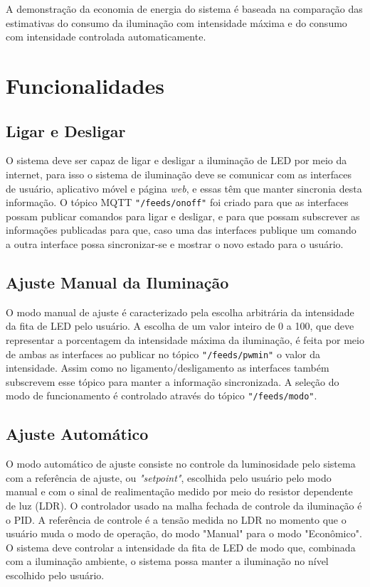 A demonstração da economia de energia do sistema é baseada na comparação das estimativas do consumo da iluminação com intensidade máxima e do consumo com intensidade controlada automaticamente.

\section{Funcionalidades}

\subsection{Ligar e Desligar}

O sistema deve ser capaz de ligar e desligar a iluminação de LED por meio da internet, para isso o sistema de iluminação deve se comunicar com as interfaces de usuário, aplicativo móvel e página \textit{web}, e essas têm que manter sincronia desta informação. O tópico MQTT \texttt{"/feeds/onoff"} foi criado para que as interfaces possam publicar comandos para ligar e desligar, e para que possam subscrever as informações publicadas para que, caso uma das interfaces publique um comando a outra interface possa sincronizar-se e mostrar o novo estado para o usuário.

\subsection{Ajuste Manual da Iluminação}

O modo manual de ajuste é caracterizado pela escolha arbitrária da intensidade da fita de LED pelo usuário. A escolha de um valor inteiro de 0 a 100, que deve representar a porcentagem da intensidade máxima da iluminação, é feita por meio de ambas as interfaces ao publicar no tópico \texttt{"/feeds/pwmin"} o valor da intensidade. Assim como no ligamento/desligamento as interfaces também subscrevem esse tópico para manter a informação sincronizada. A seleção do modo de funcionamento é controlado através do tópico \texttt{"/feeds/modo"}.

\subsection{Ajuste Automático}

O modo automático de ajuste consiste no controle da luminosidade pelo sistema com a referência de ajuste, ou \textit{"setpoint"}, escolhida pelo usuário pelo modo manual e com o sinal de realimentação medido por meio do  resistor dependente de luz (LDR). O controlador usado na malha fechada de controle da iluminação é o \acf{PID}. A referência de controle é a tensão medida no LDR no momento que o usuário muda o modo de operação, do modo "Manual" para o modo "Econômico". O sistema deve controlar a intensidade da fita de LED de modo que, combinada com a iluminação ambiente, o sistema possa manter a iluminação no nível escolhido pelo usuário.


